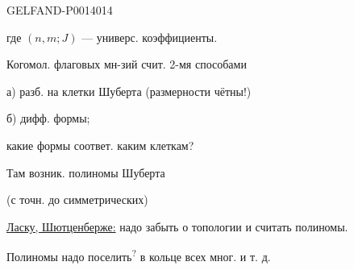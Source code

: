 \begin{GelfandAdjacentEvidence}{GELFAND-P001401}{4}


где \((n,m;J)\) — универс. коэффициенты.

Когомол. флаговых мн-зий счит. 2-мя способами

а) разб. на клетки Шуберта (размерности чётны!)

б) дифф. формы;

какие формы соответ. каким клеткам?

Там возник. полиномы Шуберта

(с точн. до симметрических)

\uline{Ласку, Шютценберже:} надо забыть о топологии и считать полиномы.

Полиномы надо
поселить\textsuperscript{?}
в кольце всех мног. и т. д.

\end{GelfandAdjacentEvidence}



